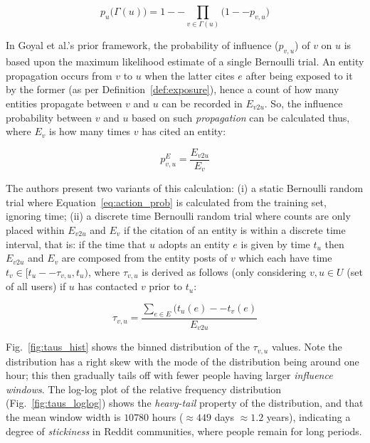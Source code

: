 \documentclass[acmsmall]{acmart}
\begin{document}
\begin{equation}
\label{eq:joint_prob}
p_u\big(\Gamma(u)\big) = 1 -- \displaystyle\prod_{v \in \Gamma(u)}\big(1 -- p_{v,u}\big)
\end{equation}

In Goyal et al.'s prior framework, the probability of influence ($p_{v,u}$) of $v$ on $u$ is based upon the maximum likelihood estimate of a single Bernoulli trial.
An entity propagation occurs from $v$ to $u$ when the latter cites $e$ after being exposed to it by the former (as per Definition~\ref{def:exposure}), hence a count of how many entities propagate between $v$ and $u$ can be recorded in $E_{v2u}$.
So, the influence probability between $v$ and $u$ based on such \emph{propagation} can be calculated thus, where $E_v$ is how many times $v$ has cited an entity:

\begin{equation}
\label{eq:action_prob}
p^{E}_{v,u} = \frac{E_{v2u}}{E_v}
\end{equation}

The authors present two variants of this calculation: (i) a static Bernoulli random trial where Equation~\ref{eq:action_prob} is calculated from the training set, ignoring time; (ii) a discrete time Bernoulli random trial where counts are only placed within $E_{v2u}$ and $E_v$ if the citation of an entity is within a discrete time interval, that is: if the time that $u$ adopts an entity $e$ is given by time $t_u$ then $E_{v2u}$ and $E_v$ are composed from the entity posts of $v$ which each have time $t_v \in [t_u -- \tau_{v,u}, t_u)$, where $\tau_{v,u}$ is derived as follows (only considering $v, u \in U$ (set of all users) if $u$ has contacted $v$ prior to $t_u$:

\begin{equation}
\tau_{v,u} = \frac{\displaystyle\sum_{e \in E} (t_u(e) -- t_v(e)}{E_{v2u}}
\end{equation}

Fig.~\ref{fig:taus_hist} shows the binned distribution of the $\tau_{v,u}$ values. Note the distribution has a right skew with the mode of the distribution being around one hour; this then gradually tails off with fewer people having larger \emph{influence windows}.
The log-log plot of the relative frequency distribution (Fig.~\ref{fig:taus_loglog}) shows the \emph{heavy-tail} property of the distribution, and that the mean window width is $10 780$ hours ($\approx 449$ days $\approx 1.2$ years), indicating a degree of \emph{stickiness} in Reddit communities, where people remain for long periods.
\end{document}
